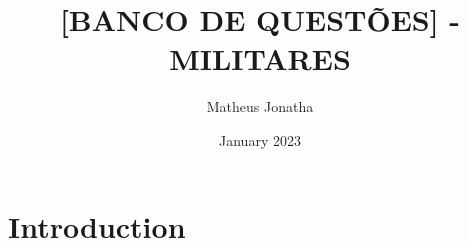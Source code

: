 \documentclass{article}
\title{[BANCO DE QUESTÕES] - MILITARES}
\author{Matheus Jonatha}
\date{January 2023}
\begin{document}
\maketitle

\section{Introduction}
\end{document}
